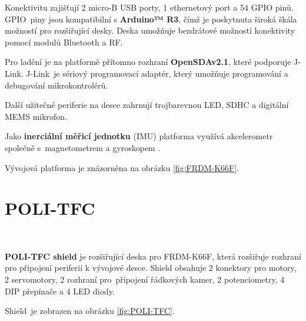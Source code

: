 Konektivitu zajišťují 2 micro-B USB porty, 1 ethernetový port a 54 GPIO pinů.
GPIO~piny jsou kompatibilní s \textbf{Arduino™ R3}, čímž je poskytnuta široká škála
možností pro rozšiřující desky. Deska umožňuje bezdrátové možností konektivity
pomocí modulů Bluetooth a RF.

Pro ladění je na platformě přítomno rozhraní \textbf{OpenSDAv2.1}, které podporuje
J-Link. J-Link~je sériový programovací adaptér, který umožňuje programování
a debugování mikrokontrolérů.

Další užitečné periferie na desce zahrnují trojbarevnou LED, SDHC a digitální MEMS
mikrofon.

Jako \textbf{inerciální měřicí jednotku} (IMU) platforma využívá akcelerometr
společně s~magnetometrem a gyroskopem \cite{frdmk66UserGuide}.

Vývojová platforma je znázorněna na obrázku \ref{fig:FRDM-K66F}.

\section{POLI-TFC}
\label{sec:POLI-TFC}\

\textbf{POLI-TFC shield} je rozšiřující deska pro FRDM-K66F, která rozšiřuje
rozhraní pro připojení periferií k vývojové desce. Shield obsahuje 2 konektory
pro motory, 2 servomotory, 2 rozhraní pro~připojení řádkových kamer, 2 
potenciometry, 4 DIP přepínače a 4 LED diody. 

Shield~je zobrazen na obrázku \ref{fig:POLI-TFC}.

